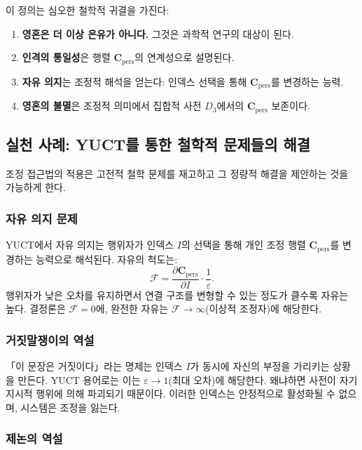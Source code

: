 \documentclass[11pt,a4paper]{article}
\newcommand{\eps}{\varepsilon}
\newcommand{\Cpers}{\mathbf{C}_{\text{pers}}}
\begin{document}
	이 정의는 심오한 철학적 귀결을 가진다:
	
	\begin{enumerate}
		\item \textbf{영혼은 더 이상 은유가 아니다.} 그것은 과학적 연구의 대상이 된다.
		\item \textbf{인격의 통일성}은 행렬 \(\Cpers\)의 연계성으로 설명된다.
		\item \textbf{자유 의지}는 조정적 해석을 얻는다: 인덱스 선택을 통해 \(\Cpers\)를 변경하는 능력.
		\item \textbf{영혼의 불멸}은 조정적 의미에서 집합적 사전 \(D_3\)에서의 \(\Cpers\) 보존이다.
	\end{enumerate}
	
	\subsection{실천 사례: YUCT를 통한 철학적 문제들의 해결}
	\label{sec:practical-cases}
	
	조정 접근법의 적용은 고전적 철학 문제를 재고하고 그 정량적 해결을 제안하는 것을 가능하게 한다.
	
	\subsubsection{자유 의지 문제}
	
	YUCT에서 자유 의지는 행위자가 인덱스 \(I\)의 선택을 통해 개인 조정 행렬 \(\Cpers\)를 변경하는 능력으로 해석된다. 자유의 척도는:
	\[
	\mathcal{F} = \frac{\partial \Cpers}{\partial I} \cdot \frac{1}{\eps}.
	\]
	행위자가 낮은 오차를 유지하면서 연결 구조를 변형할 수 있는 정도가 클수록 자유는 높다. 결정론은 \(\mathcal{F} = 0\)에, 완전한 자유는 \(\mathcal{F} \to \infty\)(이상적 조정자)에 해당한다.
	
	\subsubsection{거짓말쟁이의 역설}
	
	「이 문장은 거짓이다」라는 명제는 인덱스 \(I\)가 동시에 자신의 부정을 가리키는 상황을 만든다. YUCT 용어로는 이는 \(\eps \to 1\)(최대 오차)에 해당한다. 왜냐하면 사전이 자기지시적 행위에 의해 파괴되기 때문이다. 이러한 인덱스는 안정적으로 활성화될 수 없으며, 시스템은 조정을 잃는다.
	
	\subsubsection{제논의 역설}
	
\end{document}
